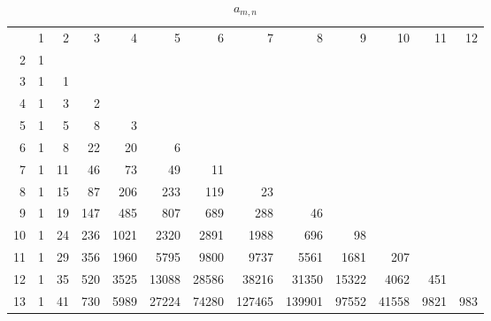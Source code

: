 \documentclass[10pt]{amsart}
\begin{document}
\begin{table}[h]
{\scriptsize \begin{tabular}{|r|rrrrrrrrrrrr|} \hline
& 1 & 2 & 3 & 4 & 5 & 6 & 7 & 8 & 9 & 10 & 11 & 12 \\
2 & 1 &&&&&&&&&&& \\
3 & 1 & 1 &&&&&&&&&& \\
4 & 1 & 3 & 2 &&&&&&&&& \\
5 & 1 & 5 & 8 & 3 &&&&&&&& \\
6 & 1 & 8 & 22 & 20 & 6 &&&&&&& \\
7 & 1 & 11 & 46 & 73 & 49 & 11 &&&&&& \\
8 & 1 & 15 & 87 & 206 & 233 & 119 & 23 &&&&& \\
9 & 1 & 19 & 147 & 485 & 807 & 689 & 288 & 46 &&&& \\
10 & 1 & 24 & 236 & 1021 & 2320 & 2891 & 1988 & 696 & 98 &&& \\
11 & 1 & 29 & 356 & 1960 & 5795 & 9800 & 9737 & 5561 & 1681 & 207 && \\
12 & 1 & 35 & 520 & 3525 & 13088 & 28586 & 38216 & 31350 & 15322 & 4062 & 451 & \\
13 & 1 & 41 & 730 & 5989 & 27224 & 74280 & 127465 & 139901 & 97552 & 41558 & 9821 & 983 \\ \hline


\end{tabular}}
\vspace{.2cm}
\caption{$a_{m,n}$}
\label{a-mn}
\end{table}
\end{document}
